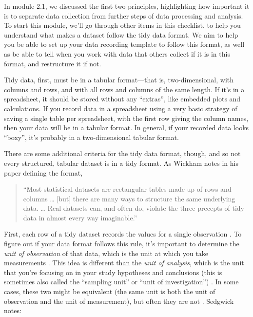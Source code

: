 \documentclass[]{tufte-book}
\begin{document}
In module 2.1, we discussed the first two principles, highlighting how
important it is to separate data collection from further steps of data
processing and analysis. To start this module, we'll go through other
items in this checklist, to help you understand what makes a dataset follow the
tidy data format. We aim to help you be able to set up your data recording template
to follow this format, as well as be able to tell when you work with data that
others collect if it is in this format, and restructure it if not.

Tidy data, first, must be in a tabular format---that is, two-dimensional, with
columns and rows, and with all rows and columns of the same length. If it's in a
spreadsheet, it should be stored without any ``extras'', like embedded plots and
calculations. If you record data in a spreadsheet using a very basic strategy
of saving a single table per spreadsheet, with the first row giving the column
names, then your data will be in a tabular format. In general, if your recorded
data looks ``boxy'', it's probably in a two-dimensional tabular format.

There are some additional criteria for the tidy data format, though, and so
not every structured, tabular dataset is in a tidy format. As Wickham notes
in his paper defining the format,

\begin{quote}
``Most statistical datasets are rectangular tables made up of rows and columns
\ldots{} {[}but{]} there are many ways to structure the same underlying data. \ldots{}
Real datasets can, and often do, violate the three precepts of tidy data in
almost every way imaginable.'' \citep{wickham2014tidy}
\end{quote}

First, each row of a tidy dataset records the values for a single observation
\citep{wickham2014tidy}. To figure out if your data format follows this rule, it's
important to determine the \emph{unit of observation} of that data, which is the unit
at which you take measurements \citep{sedgwick2014unit}. This idea is different than
the \emph{unit of analysis}, which is the unit that you're focusing on in your study
hypotheses and conclusions (this is sometimes also called the ``sampling unit'' or
``unit of investigation'') \citep{altman1997units}. In some cases, these two might be
equivalent (the same unit is both the unit of observation and the unit of
measurement), but often they are not \citep{sedgwick2014unit}. Sedgwick notes:
\end{document}
